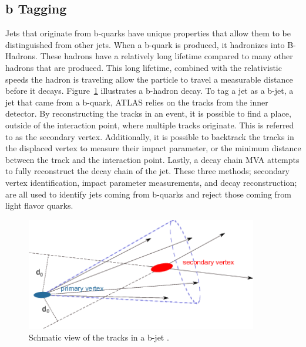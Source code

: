 \subsection{b Tagging}\label{ssec:btag}
Jets that originate from b-quarks have unique properties that allow them to be distinguished from other jets. When a b-quark is produced, it hadronizes into B-Hadrons. These hadrons have a relatively long lifetime compared to many other hadrons that are produced. This long lifetime, combined with the relativistic speeds the hadron is traveling allow the particle to travel a measurable distance before it decays. Figure~\ref{fig:bjets} illustrates a b-hadron decay. To tag a jet as a b-jet, a jet that came from a b-quark, ATLAS relies on the tracks from the inner detector. By reconstructing the tracks in an event, it is possible to find a place, outside of the interaction point, where multiple tracks originate. This is referred to as the secondary vertex. Additionally, it is possible to backtrack the tracks in the displaced vertex to measure their impact parameter, or the minimum distance between the track and the interaction point. Lastly, a decay chain MVA attempts to fully reconstruct the decay chain of the jet. These three methods; secondary vertex identification, impact parameter measurements,  and decay reconstruction; are all used to identify jets coming from b-quarks and reject those coming from light flavor quarks\cite{ATL-PHYS-PUB-2016-012}. \newline

\begin{figure}[h]
\begin{center}
\includegraphics*[width=0.90\textwidth] {figures/bjet}
\caption[Schmatic view of the tracks in a b-jet]{Schmatic view of the tracks in a b-jet \cite{HanssonAdrian:1397942}.}
\label{fig:bjets}
\end{center}
\end{figure}


